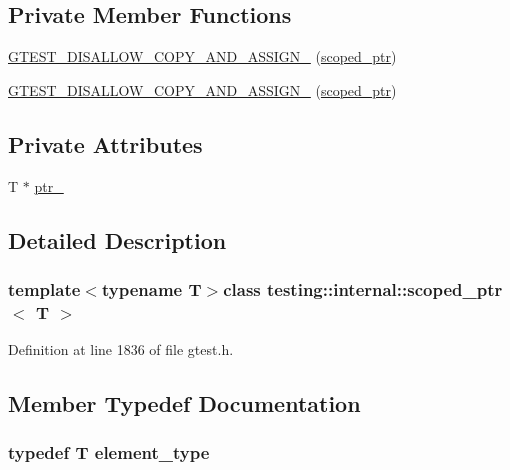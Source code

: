 \subsection*{\-Private \-Member \-Functions}
\begin{DoxyCompactItemize}
\item 
\hyperlink{classtesting_1_1internal_1_1scoped__ptr_afae742f028d29babc424c86ce32a233a}{\-G\-T\-E\-S\-T\-\_\-\-D\-I\-S\-A\-L\-L\-O\-W\-\_\-\-C\-O\-P\-Y\-\_\-\-A\-N\-D\-\_\-\-A\-S\-S\-I\-G\-N\-\_\-} (\hyperlink{classtesting_1_1internal_1_1scoped__ptr}{scoped\-\_\-ptr})
\item 
\hyperlink{classtesting_1_1internal_1_1scoped__ptr_afae742f028d29babc424c86ce32a233a}{\-G\-T\-E\-S\-T\-\_\-\-D\-I\-S\-A\-L\-L\-O\-W\-\_\-\-C\-O\-P\-Y\-\_\-\-A\-N\-D\-\_\-\-A\-S\-S\-I\-G\-N\-\_\-} (\hyperlink{classtesting_1_1internal_1_1scoped__ptr}{scoped\-\_\-ptr})
\end{DoxyCompactItemize}
\subsection*{\-Private \-Attributes}
\begin{DoxyCompactItemize}
\item 
\-T $\ast$ \hyperlink{classtesting_1_1internal_1_1scoped__ptr_ad158e2513a04fc7a316119154e3f57ea}{ptr\-\_\-}
\end{DoxyCompactItemize}


\subsection{\-Detailed \-Description}
\subsubsection*{template$<$typename \-T$>$class testing\-::internal\-::scoped\-\_\-ptr$<$ T $>$}



\-Definition at line 1836 of file gtest.\-h.



\subsection{\-Member \-Typedef \-Documentation}
\hypertarget{classtesting_1_1internal_1_1scoped__ptr_ae37fb942067e67c711beb897e7b7b5de}{
\subsubsection[{element\-\_\-type}]{\setlength{\rightskip}{0pt plus 5cm}typedef \-T {\bf element\-\_\-type}}}\label{de/d6a/classtesting_1_1internal_1_1scoped__ptr_ae37fb942067e67c711beb897e7b7b5de}


